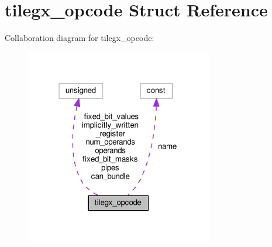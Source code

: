 \hypertarget{structtilegx__opcode}{}\section{tilegx\+\_\+opcode Struct Reference}
\label{structtilegx__opcode}


Collaboration diagram for tilegx\+\_\+opcode\+:
\nopagebreak
\begin{figure}[H]
\begin{center}
\leavevmode
\includegraphics[width=232pt]{structtilegx__opcode__coll__graph}
\end{center}
\end{figure}
